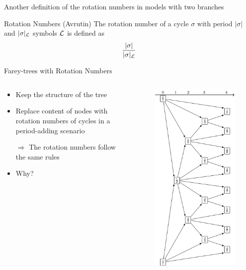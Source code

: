 \begin{frame}
	Another definition of the rotation numbers in models with two branches
	\begin{definition}{Rotation Numbers (Avrutin)}
		The rotation number of a cycle $\sigma$ with period $|\sigma|$ and $|\sigma|_{\mathcal{L}}$ symbols $\mathcal{L}$ is defined as
		\begin{align*}
			\frac{|\sigma|}{|\sigma|_{\mathcal{L}}}
		\end{align*}
	\end{definition}
\end{frame}

\begin{frame}{Farey-trees with Rotation Numbers}
	\begin{columns}
		\begin{column}{.5 \textwidth}
			\begin{itemize}
				\item Keep the structure of the tree
				\item Replace content of nodes with rotation numbers of cycles in a period-adding scenario
				\item[$\Rightarrow$] The rotation numbers follow the same rules
				\item Why?
			\end{itemize}
		\end{column}
		\begin{column}{.5 \textwidth}
			\vspace{-5em}
			\begin{figure}
				\includegraphics[width=.47 \textwidth]{../../Report/Figures/FareyTrees/LR_RotNum/adding.png}
			\end{figure}
		\end{column}
	\end{columns}
\end{frame}


